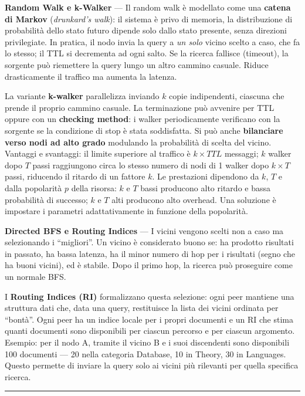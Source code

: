 \documentclass[
  italian,
  openany]{book}
\begin{document}
\textbf{Random Walk e k-Walker} --- Il random walk è modellato come una
\textbf{catena di Markov} (\emph{drunkard's walk}): il sistema è privo
di memoria, la distribuzione di probabilità dello stato futuro dipende
solo dallo stato presente, senza direzioni privilegiate. In pratica, il
nodo invia la query a \emph{un solo} vicino scelto a caso, che fa lo
stesso; il TTL si decrementa ad ogni salto. Se la ricerca fallisce
(timeout), la sorgente può riemettere la query lungo un altro cammino
casuale. Riduce drasticamente il traffico ma aumenta la latenza.

La variante \textbf{k-walker} parallelizza inviando \(k\) copie
indipendenti, ciascuna che prende il proprio cammino casuale. La
terminazione può avvenire per TTL oppure con un \textbf{checking
method}: i walker periodicamente verificano con la sorgente se la
condizione di stop è stata soddisfatta. Si può anche \textbf{bilanciare
verso nodi ad alto grado} modulando la probabilità di scelta del vicino.
Vantaggi e svantaggi: il limite superiore al traffico è \(k \times TTL\)
messaggi; \(k\) walker dopo \(T\) passi raggiungono circa lo stesso
numero di nodi di 1 walker dopo \(k \times T\) passi, riducendo il
ritardo di un fattore \(k\). Le prestazioni dipendono da \(k\), \(T\) e
dalla popolarità \(p\) della risorsa: \(k\) e \(T\) bassi producono alto
ritardo e bassa probabilità di successo; \(k\) e \(T\) alti producono
alto overhead. Una soluzione è impostare i parametri adattativamente in
funzione della popolarità.

\textbf{Directed BFS e Routing Indices} --- I vicini vengono scelti non
a caso ma selezionando i ``migliori''. Un vicino è considerato buono se:
ha prodotto risultati in passato, ha bassa latenza, ha il minor numero
di hop per i risultati (segno che ha buoni vicini), ed è stabile. Dopo
il primo hop, la ricerca può proseguire come un normale BFS.

I \textbf{Routing Indices (RI)} formalizzano questa selezione: ogni peer
mantiene una struttura dati che, data una query, restituisce la lista
dei vicini ordinata per ``bontà''. Ogni peer ha un indice locale per i
propri documenti e un RI che stima quanti documenti sono disponibili per
ciascun percorso e per ciascun argomento. Esempio: per il nodo A,
tramite il vicino B e i suoi discendenti sono disponibili 100 documenti
--- 20 nella categoria Database, 10 in Theory, 30 in Languages. Questo
permette di inviare la query solo ai vicini più rilevanti per quella
specifica ricerca.

\begin{center}\rule{0.5\linewidth}{0.5pt}\end{center}
\end{document}
